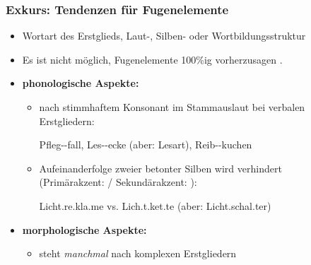 \begin{frame}
\frametitle{Exkurs: Tendenzen für Fugenelemente}

\begin{itemize}
	\item Wortart des Erstglieds, Laut-, Silben- oder Wortbildungsstruktur 
	
	\item Es ist nicht möglich, Fugenelemente 100\%ig vorherzusagen \citep[vgl.][]{Fuhrhop96a}.

\pause
	
	\item \textbf{phonologische Aspekte:}
	
	\begin{itemize}
		\item \textipa{[@]} nach stimmhaftem Konsonant im Stammauslaut bei verbalen Erstgliedern:
		
		\ea Pfleg--fall, Les--ecke (aber: Lesart), Reib--kuchen
		\z
		
		\item Aufeinanderfolge zweier betonter Silben wird verhindert\\
		(Primärakzent: \textprimstress / Sekundärakzent: \textsecstress):
		
		\ea \textprimstress Licht\alertred{\_}.re.\textsecstress kla.me vs. \textprimstress Lich.t.\textsecstress ket.te (aber: \textprimstress Licht\alertred{\_}.\textsecstress schal.ter)
		\z
			
	\end{itemize}

\pause 

	\item \textbf{morphologische Aspekte:}
	
	\begin{itemize}
		\item {} steht \emph{manchmal} nach komplexen Erstgliedern

		\z 
	\end{itemize}

\end{itemize}

\end{frame}



